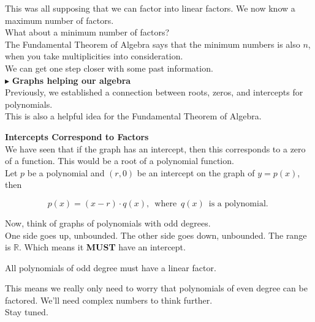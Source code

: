 \documentclass{ximera}
\begin{document}
This was all supposing that we can factor into linear factors.  We now know a maximum number of factors. \\


What about a minimum number of factors? \\

The Fundamental Theorem of Algebra says that the minimum numbers is also $n$, when you take multiplicities into consideration. \\



We can get one step closer with some past information. \\








$\blacktriangleright$ \textbf{\textcolor{blue!55!black}{Graphs helping our algebra}} \\


Previously, we established a connection between roots, zeros, and intercepts for polynomials. \\


This is also a helpful idea for the Fundamental Theorem of Algebra. \\




\begin{idea} \textbf{\textcolor{blue!55!black}{Intercepts Correspond to Factors}}   \\



We have seen that if the graph has an intercept, then this corresponds to a zero of a function.  This would be a root of a polynomial function. \\

Let $p$ be a polynomial and $(r, 0)$ be an intercept on the graph of $y = p(x)$, then 

\[
p(x) = (x-r) \cdot q(x), \, \text{ where } \, q(x) \, \text{ is a polynomial. }
\]

Now, think of graphs of polynomials with odd degrees. \\

One side goes up, unbounded.  The other side goes down, unbounded.  The range is $\mathbb{R}$.  Which means it \textbf{MUST} have an intercept.


All polynomials of odd degree must have a linear factor.




\end{idea}


This means we really only need to worry that polynomials of even degree can be factored.  We'll need complex numbers to think further. \\


Stay tuned.
\end{document}
